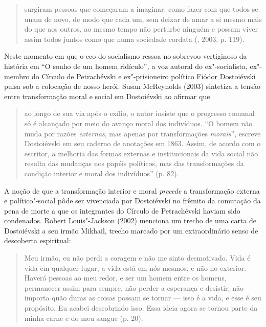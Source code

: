 \begin{quote}
surgiram pessoas que começaram a imaginar: como fazer com que todos se
unam de novo, de modo que cada um, sem deixar de amar a si mesmo mais do
que aos outros, ao mesmo tempo não perturbe ninguém e possam viver assim
todos juntos como que numa sociedade cordata (, 2003, p.
119).
\end{quote}

Neste momento em que o eco do socialismo ressoa no sobrevoo vertiginoso
da história em ``O sonho de um homem ridículo''\emph{,} a voz autoral do
ex"-socialista, ex"-membro do Círculo de Petrachévski e ex"-prisioneiro
político Fiódor Dostoiévski pulsa sob a colocação de nosso herói. Susan
McReynolds (2003) sintetiza a tensão entre transformação moral e social
em Dostoiévski ao afirmar que

\begin{quote}
ao longo de sua via após o exílio, o autor insiste que o progresso
comunal só é alcançado por meio do avanço moral dos indivíduos. ``O
homem não muda por razões \emph{externas}, mas apenas por transformações
\emph{morais}'', escreve Dostoiévski em seu caderno de anotações em
1863. Assim, de acordo com o escritor, a melhoria das formas externas e
institucionais da vida social não resulta das mudanças nos papéis
políticos, mas das transformações da condição interior e moral dos
indivíduos'' (p. 82).
\end{quote}

A noção de que a transformação interior e moral \emph{precede} a
transformação externa e político"-social pôde ser vivenciada por
Dostoiévski no frêmito da comutação da pena de morte a que os
integrantes do Círculo de Petrachévski haviam sido condenados. Robert
Louis"-Jackson (2002) menciona um trecho de uma carta de Dostoiévski a
seu irmão Mikhail, trecho marcado por um extraordinário senso de
descoberta espiritual:

\begin{quote}
Meu irmão, eu não perdi a coragem e não me sinto desmotivado. Vida é
vida em qualquer lugar, a vida está em nós mesmos, e não no exterior.
Haverá pessoas ao meu redor, e ser um homem entre os homens, permanecer
assim para sempre, não perder a esperança e desistir, não importa quão
duras as coisas possam se tornar --- isso é a vida, e esse é seu
propósito. Eu acabei descobrindo isso. Essa ideia agora se tornou parte
da minha carne e do meu sangue (p. 20).
\end{quote}

